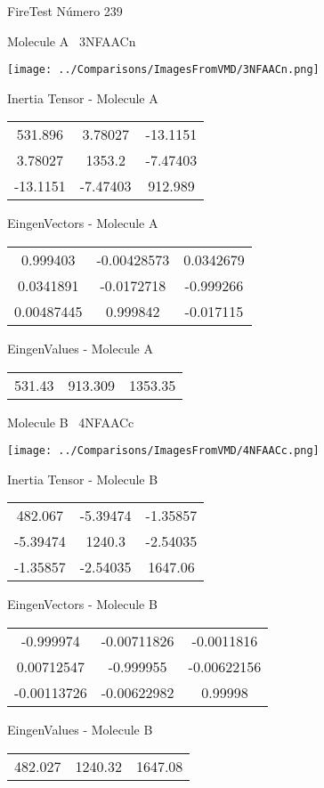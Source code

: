 \vtab[-3cm]
\begin{center}
{\large FireTest \tab Número 239}
\end{center}
\begin{multicols}{2}
\begin{center}

Molecule A \
3NFAACn

\texttt{[image: ../Comparisons/ImagesFromVMD/3NFAACn.png]}

Inertia Tensor - Molecule A \\
\begin{tabular}{|c c c|}
531.896	 & 	3.78027	 & 	-13.1151	 \\
3.78027	 & 	1353.2	 & 	-7.47403	 \\
-13.1151	 & 	-7.47403	 & 	912.989
\end{tabular}

\vtab
 EingenVectors - Molecule A     \\
\begin{tabular}{|c c c|}
0.999403	 & 	-0.00428573	 & 	0.0342679	 \\
0.0341891	 & 	-0.0172718	 & 	-0.999266	 \\
0.00487445	 & 	0.999842	 & 	-0.017115
\end{tabular}

\vtab
 EingenValues - Molecule A     \\
\begin{tabular}{|c c c|}
531.43	 & 	913.309	 & 	1353.35	 \\
\end{tabular}
\columnbreak

Molecule B \
4NFAACc

\texttt{[image: ../Comparisons/ImagesFromVMD/4NFAACc.png]}

Inertia Tensor - Molecule B \\
\begin{tabular}{|c c c|}
482.067	 & 	-5.39474	 & 	-1.35857	 \\
-5.39474	 & 	1240.3	 & 	-2.54035	 \\
-1.35857	 & 	-2.54035	 & 	1647.06
\end{tabular}

\vtab
 EingenVectors - Molecule B     \\
\begin{tabular}{|c c c|}
-0.999974	 & 	-0.00711826	 & 	-0.0011816	 \\
0.00712547	 & 	-0.999955	 & 	-0.00622156	 \\
-0.00113726	 & 	-0.00622982	 & 	0.99998
\end{tabular}

\vtab
 EingenValues - Molecule B     \\
\begin{tabular}{|c c c|}
482.027	 & 	1240.32	 & 	1647.08	 \\
\end{tabular}

\end{center}
\end{multicols}

